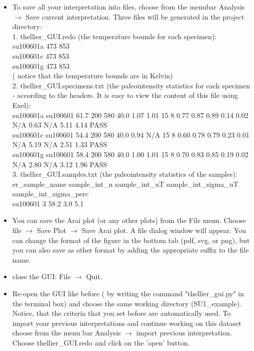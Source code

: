 \documentclass[12pt]{article}
\begin{document}
\begin{itemize}
\item To save all your interpretation into files, choose from the menubar Analysis $\rightarrow$ Save current interpretation. Three files will be generated in the project directory:\\
1. thellier\_GUI.redo (the temperature bounds for each specimen):\\
su100601a 473 853\\
su100601c 473 853\\
su100601g 473 853\\
( notice that the temperature bounds are in Kelvin)\\
2. thellier\_GUI.specimens.txt (the paleointensity statistics for each specimen - according to the headers. It is easy to view the content of this file using Exel):\\
su100601a	su100601	61.7	200	580	40.0	1.07	1.01	15	8	0.77	0.87	0.89	0.14	0.02	N/A	0.63	N/A	5.11	4.14	PASS\\
su100601c	su100601	54.4	200	580	40.0	0.94	N/A	15	8	0.60	0.78	0.79	0.23	0.01	N/A	5.19	N/A	2.51	1.33	PASS\\
su100601g	su100601	58.4	200	580	40.0	1.00	1.01	15	8	0.70	0.83	0.85	0.19	0.02	N/A	2.80	N/A	3.12	1.96	PASS\\
3. thellier\_GUI.samples.txt (the paleointensity statistics of the samples):\\
er\_sample\_name	sample\_int\_n	sample\_int\_uT	sample\_int\_sigma\_uT	sample\_int\_sigma\_perc\\
su100601	3	58.2	3.0	5.1\\
\item You can save the Arai plot (or any other plots) from the File menu. Choose  file  $\rightarrow$ Save Plot $\rightarrow$ Save Arai plot. A file dialog window will appear. You can change the format of the figure in the bottom tab (pdf, svg, or png), but you can also save as other format by adding the appropriate suffix to the file name.
\item close the GUI: File  $\rightarrow$ Quit.
\item Re-open the GUI like before ( by writing the command  "thellier\_gui.py"  in the terminal box) and choose the same working directory (SU1\_example). Notice, that the criteria that you set before are automatically used. To import your previous interpretations and continue working on this dataset choose from the menu bar Analysis $\rightarrow$ import previous interpretation. Choose thellier\_GUI.redo and click on the 'open' button.
\end{itemize}
\end{document}
